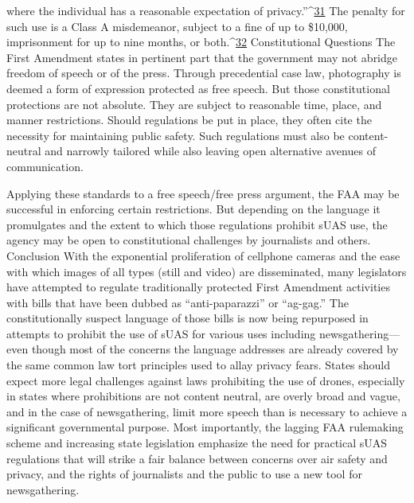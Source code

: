 where the individual has a reasonable expectation of privacy.''^{\href{#endnotes-waite-and-osterreicher}{31}} The penalty
for such use is a Class A misdemeanor, subject to a fine of up to \$10,000,
imprisonment for up to nine months, or both.^{\href{#endnotes-waite-and-osterreicher}{32}}
Constitutional Questions
The First Amendment states in pertinent part that the government may not
abridge freedom of speech or of the press. Through precedential case law,
photography is deemed a form of expression protected as free speech. But
those constitutional protections are not absolute. They are subject to reasonable
time, place, and manner restrictions. Should regulations be put in
place, they often cite the necessity for maintaining public safety. Such regulations
must also be content-neutral and narrowly tailored while also leaving
open alternative avenues of communication.

Applying these standards to a free speech/free press argument, the FAA
may be successful in enforcing certain restrictions. But depending on the
language it promulgates and the extent to which those regulations prohibit
sUAS use, the agency may be open to constitutional challenges by journalists
and others.
Conclusion
With the exponential proliferation of cellphone cameras and the ease with
which images of all types (still and video) are disseminated, many legislators
have attempted to regulate traditionally protected First Amendment activities
with bills that have been dubbed as ``anti-paparazzi'' or ``ag-gag.'' The
constitutionally suspect language of those bills is now being repurposed in
attempts to prohibit the use of sUAS for various uses including newsgathering—
even though most of the concerns the language addresses are already
covered by the same common law tort principles used to allay privacy fears.
States should expect more legal challenges against laws prohibiting the use
of drones, especially in states where prohibitions are not content neutral,
are overly broad and vague, and in the case of newsgathering, limit more
speech than is necessary to achieve a significant governmental purpose.
Most importantly, the lagging FAA rulemaking scheme and increasing state
legislation emphasize the need for practical sUAS regulations that will strike
a fair balance between concerns over air safety and privacy, and the rights of
journalists and the public to use a new tool for newsgathering.


